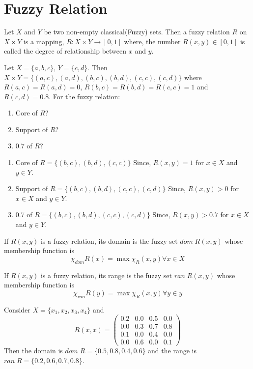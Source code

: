 \documentclass[../main-sheet.tex]{subfiles}
\begin{document}
\section{Fuzzy Relation}
\begin{defn}
    Let \(X \) and \(Y \) be two non-empty classical(Fuzzy) sets. Then a fuzzy relation \(R \) on \(X\times Y \) is a mapping, \(R:X\times Y\to[0,1]\) where, the number \(R(x,y)\in[0,1]\) is called the degree of relationship between \(x \) and \(y \).
\end{defn}
\newpage
\begin{ex}
    Let \(X=\{a,b,c \},\, Y=\{c,d \}\). Then \(X\times Y=\{(a,c),(a,d),(b,c),(b,d),(c,c),(c,d )\}\) where \(R(a,c)=R(a,d)=0\), \(R(b,c)=R(b,d)=R(c,c)=1\) and \(R(c,d)=0.8\). For the fuzzy relation:
    \begin{enumerate}
        \item Core of \(R \)?
        \item Support of \(R \)?
        \item 0.7 of \(R \)?
    \end{enumerate}
\end{ex}
\begin{soln}\hfil
    \begin{enumerate}
        \item Core of \(R=\{(b,c),(b,d),(c,c )\}\) Since, \(R(x,y)=1\) for \(x\in X \) and \(y\in Y \).
        \item Support of \(R=\{(b,c),(b,d),(c,c ),(c,d)\}\) Since, \(R(x,y)>0\) for \(x\in X \) and \(y\in Y \).
        \item 0.7 of \(R=\{(b,c),(b,d),(c,c ),(c,d)\}\) Since, \(R(x,y)>0.7\) for \(x\in X \) and \(y\in Y \).
    \end{enumerate}
\end{soln}
\begin{defn}[Domain]
    If  \(R(x,y)\) is a fuzzy relation, its domain is the fuzzy set \(dom \;R(x,y)\) whose membership function is
    \[\chi_{dom}R(x)=\max \chi_R (x,y)\forall x\in X\]
\end{defn}
\begin{defn}[Range]
    If  \(R(x,y)\) is a fuzzy relation, its range is the fuzzy set \(ran \;R(x,y)\) whose membership function is
    \[\chi_{ran}R(y)=\max \chi_R (x,y)\forall y\in y\]
\end{defn}
\begin{ex}
    Consider \(X=\{x_1,x_2,x_3,x_4\}\) and \[R(x,x)=\begin{pmatrix}
        0.2 & 0.0 & 0.5 & 0.0 \\
        0.0 & 0.3 & 0.7 & 0.8 \\
        0.1 & 0.0 & 0.4 & 0.0 \\
        0.0 & 0.6 & 0.0 & 0.1 
    \end{pmatrix}\] Then the domain is \(dom \;R=\{0.5,0.8,0.4,0.6\}\) and the range is \(ran\;R=\{0.2,0.6,0.7,0.8\}\).
\end{ex}
\end{document}
